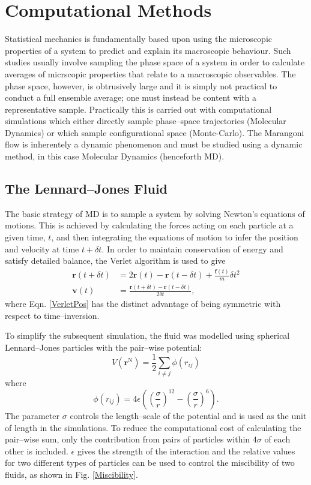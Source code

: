 \section{Computational Methods}


Statistical mechanics is fundamentally based upon using the microscopic properties of a system to predict and explain its macroscopic behaviour.\cite{StatMech}
Such studies usually involve sampling the phase space of a system in order to calculate averages of micrscopic properties that relate to a macroscopic observables.
The phase space, however, is obtrusively large and it is simply not practical to conduct a full ensemble average; one must instead be content with a representative sample.\cite{Bopp2008}
Practically this is carried out with computational simulations which either directly sample phase--space trajectories (Molecular Dynamics) or which sample configurational space (Monte-Carlo).
The Marangoni flow is inherentely a dynamic phenomenon and must be studied using a dynamic method, in this case Molecular Dynamics (henceforth MD).

\subsection{The Lennard--Jones Fluid}
The basic strategy of MD is to sample a system by solving Newton's equations of motions.
This is achieved by calculating the forces acting on each particle at a given time, $t$, and then integrating the equations of motion to infer the position and velocity at time $t + \delta t$.
In order to maintain conservation of energy and satisfy detailed balance, the Verlet algorithm is used to give
\begin{align}
\label{VerletPos}
\mathbf{r}( t + \delta t) &= 2 \mathbf{r}(t) - \mathbf{r}(t-\delta t) + \frac{\mathbf{f}(t)}{m} \delta t ^ {2}\\
\label{VerletVel}
\mathbf{v}(t) &= \frac{\mathbf{r}(t+\delta t) - \mathbf{r}(t-\delta t)}{2 \delta t},
\end{align}
where Eqn. \ref{VerletPos} has the distinct advantage of being symmetric with respect to time--inversion.

To simplify the subsequent simulation, the fluid was modelled using spherical Lennard--Jones particles with the pair--wise potential:
\begin{equation}
V \left( \mathbf{r}^{\mathrm{N}} \right) = \frac{1}{2} \sum_{i\neq j} \phi \left( r_{ij} \right)
\end{equation}
where
\begin{equation}
\label{LJ}
\phi \left( r_{ij} \right) = 4 \epsilon \left( \left( \frac{\sigma}{r}\right)^{12} - \left( \frac{\sigma}{r}\right)^{6} \right).
\end{equation}
The parameter $\sigma$ controls the length--scale of the potential and is used as the unit of length in the simulations.
To reduce the computational cost of calculating the pair--wise sum, only the contribution from pairs of particles within $4\sigma$ of each other is included.
$\epsilon$ gives the strength of the interaction and the relative values for two different types of particles can be used to control the miscibility of two fluids, as shown in Fig. \ref{Miscibility}.

